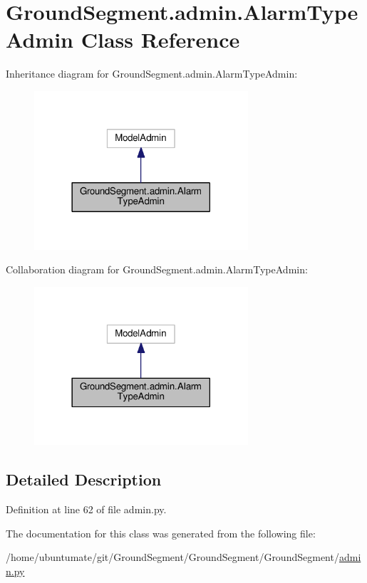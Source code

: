 \hypertarget{class_ground_segment_1_1admin_1_1_alarm_type_admin}{}\section{Ground\+Segment.\+admin.\+Alarm\+Type\+Admin Class Reference}
\label{class_ground_segment_1_1admin_1_1_alarm_type_admin}


Inheritance diagram for Ground\+Segment.\+admin.\+Alarm\+Type\+Admin\+:\nopagebreak
\begin{figure}[H]
\begin{center}
\leavevmode
\includegraphics[width=225pt]{class_ground_segment_1_1admin_1_1_alarm_type_admin__inherit__graph}
\end{center}
\end{figure}


Collaboration diagram for Ground\+Segment.\+admin.\+Alarm\+Type\+Admin\+:\nopagebreak
\begin{figure}[H]
\begin{center}
\leavevmode
\includegraphics[width=225pt]{class_ground_segment_1_1admin_1_1_alarm_type_admin__coll__graph}
\end{center}
\end{figure}


\subsection{Detailed Description}


Definition at line 62 of file admin.\+py.



The documentation for this class was generated from the following file\+:\begin{DoxyCompactItemize}
\item 
/home/ubuntumate/git/\+Ground\+Segment/\+Ground\+Segment/\+Ground\+Segment/\hyperlink{admin_8py}{admin.\+py}\end{DoxyCompactItemize}
